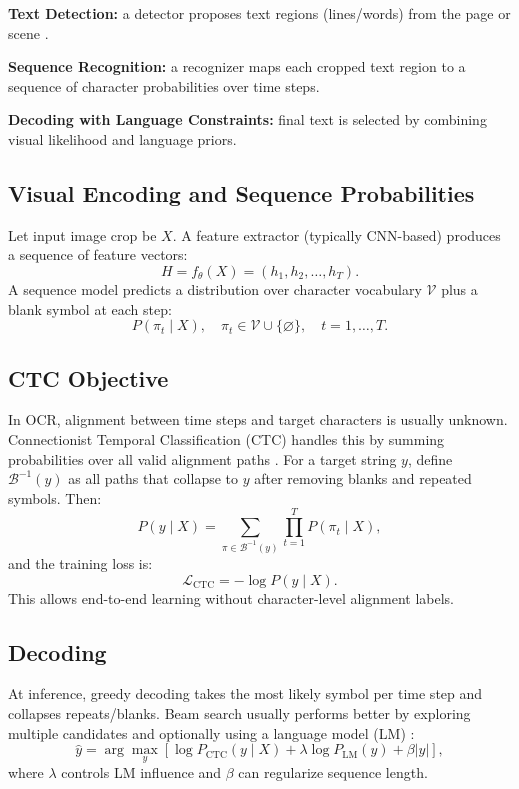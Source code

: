 \documentclass[11pt]{article}
\begin{document}
\textbf{Text Detection:} a detector proposes text regions (lines/words) from the page or scene \cite{liao2020db}.

\textbf{Sequence Recognition:} a recognizer maps each cropped text region to a sequence of character probabilities over time steps.

\textbf{Decoding with Language Constraints:} final text is selected by combining visual likelihood and language priors.

\subsection{Visual Encoding and Sequence Probabilities}
Let input image crop be $X$. A feature extractor (typically CNN-based) produces a sequence of feature vectors:
\[
H = f_{\theta}(X) = (h_1, h_2, \ldots, h_T).
\]
A sequence model predicts a distribution over character vocabulary $\mathcal{V}$ plus a blank symbol at each step:
\[
P(\pi_t \mid X), \quad \pi_t \in \mathcal{V} \cup \{\varnothing\}, \quad t=1,\ldots,T.
\]

\subsection{CTC Objective}
In OCR, alignment between time steps and target characters is usually unknown. Connectionist Temporal Classification (CTC) handles this by summing probabilities over all valid alignment paths \cite{graves2006ctc}. For a target string $y$, define $\mathcal{B}^{-1}(y)$ as all paths that collapse to $y$ after removing blanks and repeated symbols. Then:
\[
P(y \mid X) = \sum_{\pi \in \mathcal{B}^{-1}(y)} \prod_{t=1}^{T} P(\pi_t \mid X),
\]
and the training loss is:
\[
\mathcal{L}_{\text{CTC}} = -\log P(y \mid X).
\]
This allows end-to-end learning without character-level alignment labels.

\subsection{Decoding}
At inference, greedy decoding takes the most likely symbol per time step and collapses repeats/blanks. Beam search usually performs better by exploring multiple candidates and optionally using a language model (LM) \cite{shi2016crnn,shi2017aster}:
\[
\hat{y} = \arg\max_{y} \left[\log P_{\text{CTC}}(y \mid X) + \lambda \log P_{\text{LM}}(y) + \beta |y|\right],
\]
where $\lambda$ controls LM influence and $\beta$ can regularize sequence length.
\end{document}
